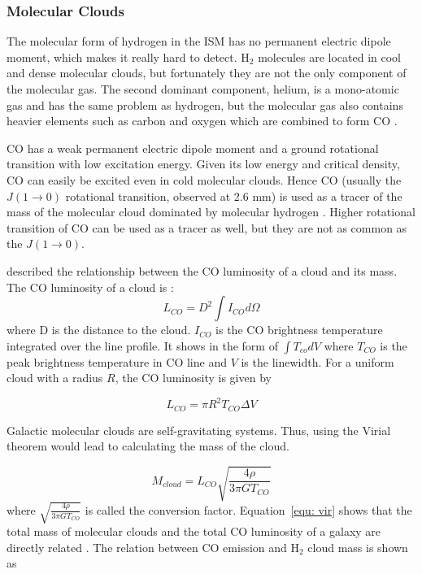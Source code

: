 \subsubsection*{Molecular Clouds}

 The molecular form of hydrogen in the ISM has no permanent electric dipole moment, which makes it really hard to detect. H$_2$ molecules are located in cool and dense molecular clouds, but fortunately they are not the only component of the molecular gas. The second dominant component, helium, is a mono-atomic gas and has the same problem as hydrogen, but the molecular gas also contains heavier elements such as carbon and oxygen which are combined to form CO \citep{Bolato13}. 
 
CO has a weak permanent electric dipole moment and a ground rotational transition with low excitation energy. Given its low energy and critical density, CO can easily be excited even in cold molecular clouds. Hence CO (usually the $J(1\rightarrow 0)$ rotational transition, observed at 2.6 mm) is used as a tracer of the mass of the molecular cloud dominated by molecular hydrogen \citep[see, for example,][] {Sanders84}. Higher rotational transition of CO can be used as a tracer as well, but they are not as common as the $J(1\rightarrow 0)$.

\cite{Young91} described the relationship between the CO luminosity of a cloud and its mass. The CO luminosity of a cloud is :
\begin{equation}
L_{CO} = D^2 \int I_{CO} d\Omega 
\end{equation}
where D is the distance to the cloud. $I_{CO}$ is the CO brightness temperature integrated over the line profile. It shows in the form of ${\int T_{co} dV}$ where $T_{CO}$ is the peak brightness temperature in CO line and $V$ is the linewidth. For a uniform cloud with a radius $R$, the CO luminosity is given by

 \begin{equation}
L_{CO} = \pi R^2 T_{CO} \Delta V
\end{equation}

Galactic molecular clouds are self-gravitating systems. Thus, using the Virial theorem would lead to calculating the mass of the cloud.

 \begin{equation}
 \label{equ: vir}
 M_{cloud} = L_{CO} \sqrt{\frac{4\rho}{3\pi G T_{CO}}}
 \end{equation}
 where $\sqrt{\frac{4\rho}{3\pi G T_{CO}}}$ is called the conversion factor. Equation~\ref{equ: vir} shows that the total mass of molecular clouds and the total CO luminosity of a galaxy are directly related \citep{Young91}. The relation between CO emission and H$_2$ cloud mass is shown as

